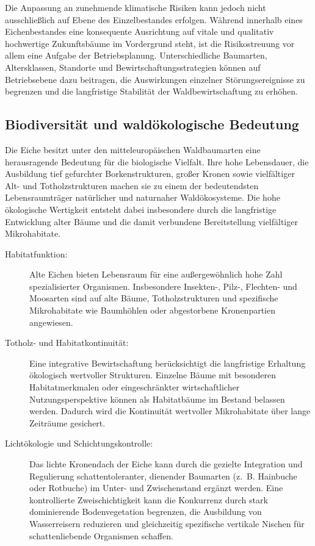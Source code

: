 \documentclass[twocolumn, bibliography=totoc, abstract=true]{scrartcl}
\begin{document}
Die Anpassung an zunehmende klimatische Risiken kann jedoch nicht ausschließlich auf Ebene des Einzelbestandes erfolgen. Während innerhalb eines Eichenbestandes eine konsequente Ausrichtung auf vitale und qualitativ hochwertige Zukunftsbäume im Vordergrund steht, ist die Risikostreuung vor allem eine Aufgabe der Betriebsplanung. Unterschiedliche Baumarten, Altersklassen, Standorte und Bewirtschaftungsstrategien können auf Betriebsebene dazu beitragen, die Auswirkungen einzelner Störungsereignisse zu begrenzen und die langfristige Stabilität der Waldbewirtschaftung zu erhöhen.

\subsection{Biodiversität und waldökologische Bedeutung}

Die Eiche besitzt unter den mitteleuropäischen Waldbaumarten eine herausragende Bedeutung für die biologische Vielfalt. Ihre hohe Lebensdauer, die Ausbildung tief gefurchter Borkenstrukturen, großer Kronen sowie vielfältiger Alt- und Totholzstrukturen machen sie zu einem der bedeutendsten Lebensraumträger natürlicher und naturnaher Waldökosysteme. Die hohe ökologische Wertigkeit entsteht dabei insbesondere durch die langfristige Entwicklung alter Bäume und die damit verbundene Bereitstellung vielfältiger Mikrohabitate.

\begin{description}
\item[Habitatfunktion:] Alte Eichen bieten Lebensraum für eine außergewöhnlich hohe Zahl spezialisierter Organismen. Insbesondere Insekten-, Pilz-, Flechten- und Moosarten sind auf alte Bäume, Totholzstrukturen und spezifische Mikrohabitate wie Baumhöhlen oder abgestorbene Kronenpartien angewiesen.
\item[Totholz- und Habitatkontinuität:] Eine integrative Bewirtschaftung berücksichtigt die langfristige Erhaltung ökologisch wertvoller Strukturen. Einzelne Bäume mit besonderen Habitatmerkmalen oder eingeschränkter wirtschaftlicher Nutzungsperspektive können als Habitatbäume im Bestand belassen werden. Dadurch wird die Kontinuität wertvoller Mikrohabitate über lange Zeiträume gesichert.
\item[Lichtökologie und Schichtungskontrolle:] Das lichte Kronendach der Eiche kann durch die gezielte Integration und Regulierung schattentoleranter, dienender Baumarten (z.~B. Hainbuche oder Rotbuche) im Unter- und Zwischenstand ergänzt werden. Eine kontrollierte Zweischichtigkeit kann die Konkurrenz durch stark dominierende Bodenvegetation begrenzen, die Ausbildung von Wasserreisern reduzieren und gleichzeitig spezifische vertikale Nischen für schattenliebende Organismen schaffen.
\end{description}
\end{document}
